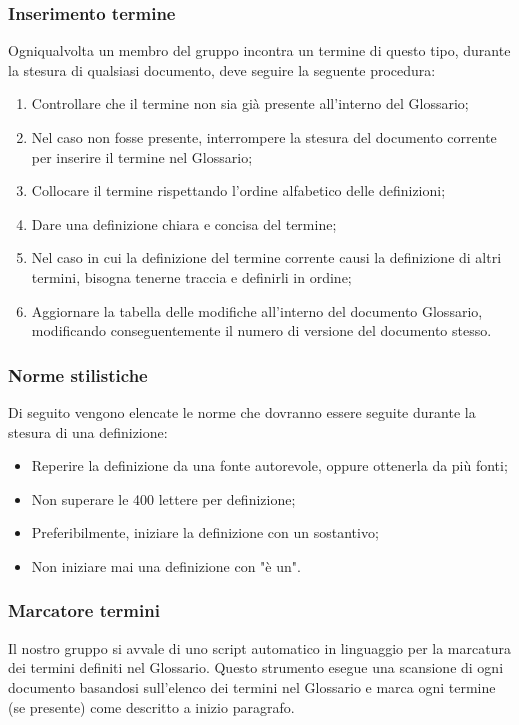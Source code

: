 \subsubsection{Inserimento termine} 
\label{7.1}
Ogniqualvolta un membro del gruppo incontra un termine di questo tipo, durante la stesura di qualsiasi documento, deve seguire la seguente procedura:
\begin{enumerate}
\item Controllare che il termine non sia già presente all'interno del Glossario;
\item Nel caso non fosse presente, interrompere la stesura del documento corrente per inserire il termine nel Glossario;
\item Collocare il termine rispettando l'ordine alfabetico delle definizioni;
\item Dare una definizione chiara e concisa del termine;
\item Nel caso in cui la definizione del termine corrente causi la definizione di altri termini, bisogna tenerne traccia e definirli in ordine;
\item Aggiornare la tabella delle modifiche all'interno del documento Glossario, modificando conseguentemente il numero di versione del documento stesso.
\end{enumerate}

\subsubsection{Norme stilistiche}
\label{7.2}
Di seguito vengono elencate le norme che dovranno essere seguite durante la stesura di una definizione:
\begin{itemize}
\item Reperire la definizione da una fonte autorevole, oppure ottenerla da più fonti;
\item Non superare le 400 lettere per definizione;
\item Preferibilmente, iniziare la definizione con un sostantivo;
\item Non iniziare mai una definizione con "è un".
\end{itemize}

\subsubsection{Marcatore termini}
\label{7.3}
Il nostro gruppo si avvale di uno script automatico in linguaggio  per la marcatura dei termini definiti nel Glossario. Questo strumento esegue una scansione di ogni documento basandosi sull'elenco dei termini nel Glossario e marca ogni termine (se presente) come descritto a inizio paragrafo.




